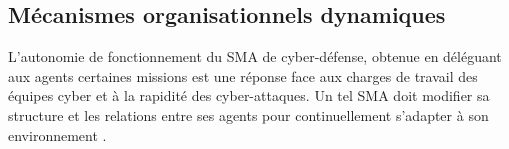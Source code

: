\documentclass[conference]{IEEEtran}
\begin{document}


\subsection{Mécanismes organisationnels dynamiques}

L'autonomie de fonctionnement du SMA de cyber-défense, obtenue  en déléguant aux agents certaines missions %
est une réponse face aux charges de travail des équipes cyber et à la rapidité des cyber-attaques\cite{ieeesp_KottT20}.
Un tel SMA doit modifier sa structure et les relations entre ses agents pour continuellement s'adapter à son environnement \cite{theron_autonomous_2021}.

\end{document}
